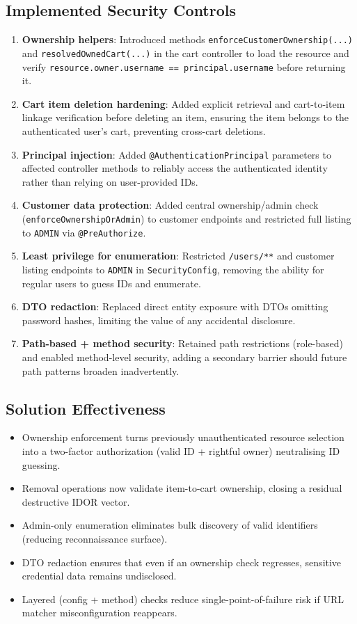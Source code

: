 \documentclass[]{UCD_CS_FYP_Report}
\begin{document}
\subsection*{Implemented Security Controls}
\begin{enumerate}
	\item \textbf{Ownership helpers}: Introduced methods \texttt{enforceCustomerOwnership(...)} and \texttt{resolvedOwnedCart(...)} in the cart controller to load the resource and verify \texttt{resource.owner.username == principal.username} before returning it.
	\item \textbf{Cart item deletion hardening}: Added explicit retrieval and cart-to-item linkage verification before deleting an item, ensuring the item belongs to the authenticated user's cart, preventing cross-cart deletions.
	\item \textbf{Principal injection}: Added \texttt{@AuthenticationPrincipal} parameters to affected controller methods to reliably access the authenticated identity rather than relying on user-provided IDs.
	\item \textbf{Customer data protection}: Added central ownership/admin check (\texttt{enforceOwnershipOrAdmin}) to customer endpoints and restricted full listing to \texttt{ADMIN} via \texttt{@PreAuthorize}.
	\item \textbf{Least privilege for enumeration}: Restricted \texttt{/users/**} and customer listing endpoints to \texttt{ADMIN} in \texttt{SecurityConfig}, removing the ability for regular users to guess IDs and enumerate.
	\item \textbf{DTO redaction}: Replaced direct entity exposure with DTOs omitting password hashes, limiting the value of any accidental disclosure.
	\item \textbf{Path-based + method security}: Retained path restrictions (role-based) and enabled method-level security, adding a secondary barrier should future path patterns broaden inadvertently.
\end{enumerate}

\subsection*{Solution Effectiveness}
\begin{itemize}
	\item Ownership enforcement turns previously unauthenticated resource selection into a two-factor authorization (valid ID + rightful owner) neutralising ID guessing.
	\item Removal operations now validate item-to-cart ownership, closing a residual destructive IDOR vector.
	\item Admin-only enumeration eliminates bulk discovery of valid identifiers (reducing reconnaissance surface).
	\item DTO redaction ensures that even if an ownership check regresses, sensitive credential data remains undisclosed.
	\item Layered (config + method) checks reduce single-point-of-failure risk if URL matcher misconfiguration reappears.
\end{itemize}
\end{document}

